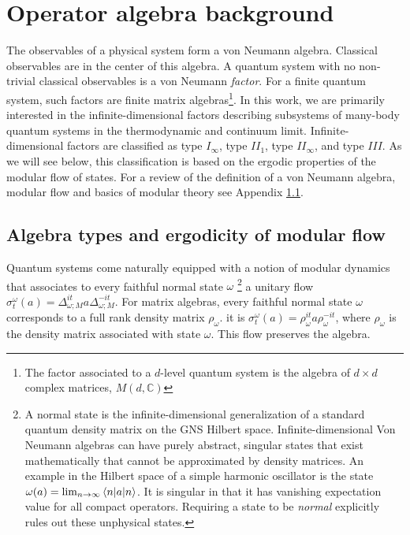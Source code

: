 \documentclass[a4paper,11pt]{article}
\theoremstyle{definition}
\begin{document}
\section{Operator algebra background}\label{section:basics}

The observables of a physical system form a von Neumann algebra. Classical observables are in the center of this algebra. A quantum system with no non-trivial classical observables is a von Neumann \emph{factor}. For a finite quantum system, such factors are
finite matrix algebras\footnote{The factor associated to a $d$-level quantum system is the algebra of $d\times d$ complex matrices, $M(d,\mathbb{C})$}. 
In this work, we are primarily interested in the infinite-dimensional factors describing subsystems of many-body quantum systems in the thermodynamic and continuum limit. Infinite-dimensional factors are classified as type $I_\infty$, type $II_1$, type $II_\infty$, and type $III$. As we will see below, this classification is based on the ergodic properties of the modular flow of states. For a review of the definition of a von Neumann algebra, modular flow and basics of modular theory see Appendix \ref{}.

\subsection{Algebra types and ergodicity of modular flow}

Quantum systems come naturally equipped with a notion of modular dynamics that associates to every faithful normal state $\omega$ \footnote{A normal state is the infinite-dimensional generalization of a standard quantum density matrix on the GNS Hilbert space. Infinite-dimensional Von Neumann algebras can have purely abstract, singular states that exist mathematically that cannot be approximated by density matrices. An example in the Hilbert space of a simple harmonic oscillator is the state $\omega(a)=\lim_{n\to \infty}\braket{n|a|n}$. It is singular in that it has vanishing expectation value for all compact operators. Requiring a state to be {\it normal} explicitly rules out these unphysical states.} a unitary flow
$\sigma^{\omega}_t(a)=\Delta_{\omega;M}^{it}a\Delta_{\omega;M}^{-it}$. 
For matrix algebras, every faithful normal state $\omega$ corresponds to a full rank density matrix $\rho_\omega$. it is $\sigma^{\omega}_t(a)=\rho_\omega^{it}a\rho_\omega^{-it}$, where $\rho_\omega$ is the density matrix associated with state $\omega$. This flow preserves the algebra.
\end{document}
